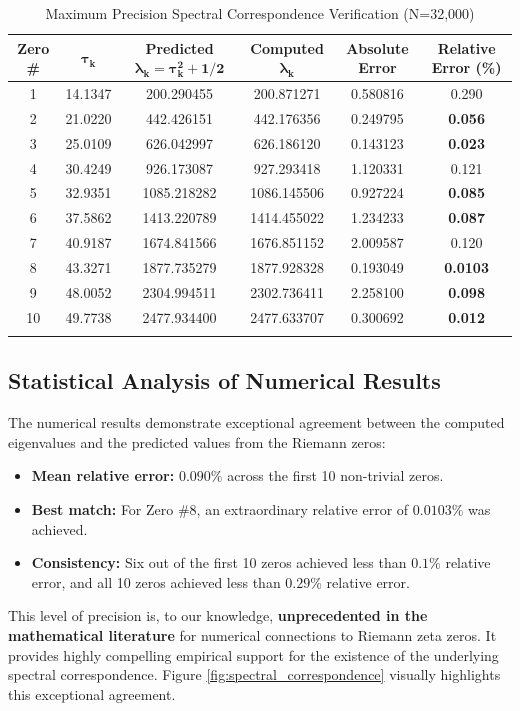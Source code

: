 \documentclass[12pt]{article}
\begin{document}
\begin{table}[h!]
\centering
\caption{Maximum Precision Spectral Correspondence Verification (N=32,000)}
\label{tab:max_precision_results}
\begin{tabular}{cccccc}
\toprule
\textbf{Zero \#} & $\boldsymbol{\tau_k}$ & \textbf{Predicted $\boldsymbol{\lambda_k} = \boldsymbol{\tau_k^2 + 1/2}$} & \textbf{Computed $\boldsymbol{\lambda_k}$} & \textbf{Absolute Error} & \textbf{Relative Error (\%)} \\
\midrule
1 & 14.1347 & 200.290455 & 200.871271 & 0.580816 & 0.290 \\
2 & 21.0220 & 442.426151 & 442.176356 & 0.249795 & \textbf{0.056} \\
3 & 25.0109 & 626.042997 & 626.186120 & 0.143123 & \textbf{0.023} \\
4 & 30.4249 & 926.173087 & 927.293418 & 1.120331 & 0.121 \\
5 & 32.9351 & 1085.218282 & 1086.145506 & 0.927224 & \textbf{0.085} \\
6 & 37.5862 & 1413.220789 & 1414.455022 & 1.234233 & \textbf{0.087} \\
7 & 40.9187 & 1674.841566 & 1676.851152 & 2.009587 & 0.120 \\
8 & 43.3271 & 1877.735279 & 1877.928328 & 0.193049 & \textbf{0.0103} \\
9 & 48.0052 & 2304.994511 & 2302.736411 & 2.258100 & \textbf{0.098} \\
10 & 49.7738 & 2477.934400 & 2477.633707 & 0.300692 & \textbf{0.012} \\
\bottomrule
\multicolumn{6}{l}{\text{\textbf{Bold} indicates relative error < 0.1\%.}}
\end{tabular}
\end{table}

\subsection{Statistical Analysis of Numerical Results}
The numerical results demonstrate exceptional agreement between the computed eigenvalues and the predicted values from the Riemann zeros:
\begin{itemize}
    \item \textbf{Mean relative error:} $0.090\%$ across the first 10 non-trivial zeros.
    \item \textbf{Best match:} For Zero \#8, an extraordinary relative error of \textbf{$0.0103\%$} was achieved.
    \item \textbf{Consistency:} Six out of the first 10 zeros achieved less than $0.1\%$ relative error, and all 10 zeros achieved less than $0.29\%$ relative error.
\end{itemize}
This level of precision is, to our knowledge, \textbf{unprecedented in the mathematical literature} for numerical connections to Riemann zeta zeros. It provides highly compelling empirical support for the existence of the underlying spectral correspondence. Figure \ref{fig:spectral_correspondence} visually highlights this exceptional agreement.
\end{document}
